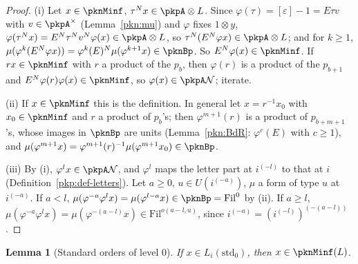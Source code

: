 \documentclass[10pt]{amsart}
\newtheorem{lemma}[theorem]{Lemma}
\theoremstyle{definition}
\theoremstyle{remark}
\begin{document}
\begin{proof}
(i) Let $x\in\pknMinf$, $\tau^Nx\in\pkpA\otimes L$. Since $\varphi(\tau)=[\varepsilon]-1=E\tau v$ with
$v\in\pkpA^\times$ (Lemma~\ref{pkn:mu}) and $\varphi$ fixes $1\otimes y$, $\varphi(\tau^Nx)=E^N\tau^Nv^N\varphi(x)
\in\pkpA\otimes L$, so $\tau^N(E^N\varphi x)\in\pkpA\otimes L$; and for $k\ge1$, $\mu(\varphi^k(E^N\varphi
x))=\varphi^k(E)^N\mu(\varphi^{k+1}x)\in\pknBp$. So $E^N\varphi(x)\in\pknMinf$. If $rx\in\pknMinf$ with $r$ a
product of the $p_b$, then $\varphi(r)$ is a product of the $p_{b+1}$ and $E^N\varphi(r)\varphi(x)\in\pknMinf$,
so $\varphi(x)\in\pkpA\mathcal N$; iterate.

(ii) If $x\in\pknMinf$ this is the definition. In general let $x=r^{-1}x_0$ with $x_0\in\pknMinf$ and $r$ a
product of $p_b$'s; then $\varphi^{m+1}(r)$ is a product of $p_{b+m+1}$'s, whose images in $\pknBp$ are units
(Lemma~\ref{pkn:BdR}: $\varphi^{c}(E)$ with $c\ge1$), and $\mu(\varphi^{m+1}x)=\varphi^{m+1}(r)^{-1}\mu(\varphi^{m+1}
x_0)\in\pknBp$.

(iii) By (i), $\varphi^lx\in\pkpA\mathcal N$, and $\varphi^l$ maps the letter part at $i^{(-l)}$ to that at $i$
(Definition~\ref{pkp:def-letters}). Let $a\ge0$, $u\in U(i^{(-a)})$, $\mu$ a form of type $u$ at $i^{(-a)}$.
If $a<l$, $\mu(\varphi^{-a}\varphi^lx)=\mu(\varphi^{l-a}x)\in\pknBp=\mathrm{Fil}^0$ by (ii). If $a\ge l$,
$\mu(\varphi^{-a}\varphi^lx)=\mu(\varphi^{-(a-l)}x)\in\mathrm{Fil}^{o(a-l,u)}$, since $i^{(-a)}=(i^{(-l)})^{(-(a-l))}$.
\end{proof}

\begin{lemma}[Standard orders of level $0$]\label{pkt:std0}
If $x\in L_i(\mathrm{std}_0)$, then $x\in\pknMinf(L)$.
\end{lemma}
\end{document}
